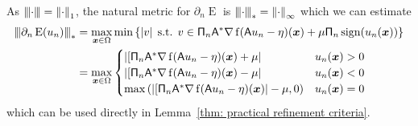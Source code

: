 \documentclass[smallextended]{svjour3}
\newcommand{\norm}[1]{{\left\lVert #1 \right\rVert}}
\newcommand{\Norm}[1]{{\left\vert\kern-0.25ex\left\vert\kern-0.25ex\left\vert #1 \right\vert\kern-0.25ex\right\vert\kern-0.25ex\right\vert}}
\newcommand{\op}[1]{\operatorname{#1}}
\newcommand{\1}{\F{1}}
\DeclareMathOperator{\st}{\;s.t.\;}
\DeclareMathOperator{\sign}{sign}
\newcommand{\data}{\eta}
\newcommand{\Domain}{\Omega}\newcommand{\domain}{\omega}
\newcommand*{\var}[1]{%
	\IfEqCase{#1}{%
		{0}{u}%
		{1}{v}%
		{2}{w}%
	}[u#1]%
}
\begin{document}
	As $\Norm\cdot = \norm\cdot_1$, the natural metric for $\partial_n\op{E}$ is $\Norm\cdot_* = \norm\cdot_\infty$ which we can estimate
	\begin{align}
		\Norm{\partial_n \op{E}(\var0_n)}_* &= \max_{\vec{x}\in\Domain}\min\left\{|\var1| \st \var1\in \tens{\Pi}_n\A^*\nabla\op{f}(\A\var0_n-\data)(\vec{x}) +  \mu\tens{\Pi}_n\sign(\var0_n(\vec{x}))\right\}
		\\&= \max_{\vec{x}\in\Domain}\begin{cases}
			|[\tens{\Pi}_n\A^*\nabla\op{f}(\A\var0_n-\data)(\vec{x}) + \mu| & \var0_n(\vec{x})>0
			\\|[\tens{\Pi}_n\A^*\nabla\op{f}(\A\var0_n-\data)(\vec{x}) - \mu| & \var0_n(\vec{x})<0
			\\\max\left(|[\tens{\Pi}_n\A^*\nabla\op{f}(\A\var0_n-\data)(\vec{x})| - \mu, 0\right) & \var0_n(\vec{x}) = 0
		\end{cases}
	\end{align}
	which can be used directly in Lemma~\ref{thm: practical refinement criteria}.
	
\end{document}
